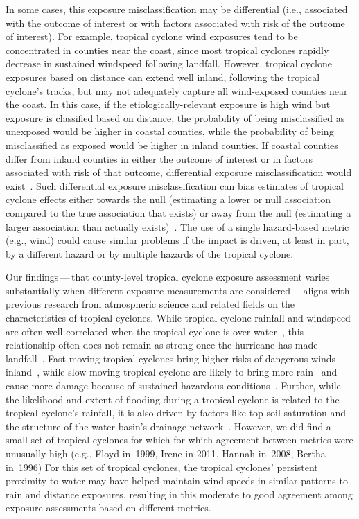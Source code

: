 In some cases, this exposure misclassification may be differential (i.e.,
associated with the outcome of interest or with factors associated with risk of
the outcome of interest). For example, tropical cyclone wind exposures tend to
be concentrated in counties near the coast, since most tropical cyclones
rapidly decrease in sustained windspeed following landfall. However, tropical
cyclone exposures based on distance can extend well inland, following the
tropical cyclone's tracks, but may not adequately capture all wind-exposed
counties near the coast. In this case, if the etiologically-relevant exposure
is high wind but exposure is classified based on distance, the probability of
being misclassified as unexposed would be higher in coastal counties, while the
probability of being misclassified as exposed would be higher in inland
counties. If coastal counties differ from inland counties in either the outcome
of interest or in factors associated with risk of that outcome, differential
exposure misclassification would exist~\parencite{savitz2016interpreting}. Such
differential exposure misclassification can bias estimates of tropical cyclone
effects either towards the null (estimating a lower or null association
compared to the true association that exists) or away from the null (estimating
a larger association than actually exists)~\parencite{savitz2016interpreting,
armstrong1998effect}. The use of a single hazard-based metric (e.g., wind)
could cause similar problems if the impact is driven, at least in part, by a
different hazard or by multiple hazards of the tropical cyclone.

Our findings\,---\,that county-level tropical cyclone exposure assessment varies
substantially when different exposure measurements are considered\,---\,aligns with
previous research from atmospheric science and related fields on the
characteristics of tropical cyclones. While tropical cyclone rainfall and
windspeed are often well-correlated when the tropical cyclone is over
water~\parencite{cerveny2000}, this relationship often does not remain as strong
once the hurricane has made landfall~\parencite{jiang2008}.  Fast-moving tropical
cyclones bring higher risks of dangerous winds inland~\parencite{kruk2010}, while
slow-moving tropical cyclone are likely to bring more
rain~\parencite{rappaport2000} and cause more damage because of sustained hazardous
conditions~\parencite{rezapour2014}. Further, while the likelihood and extent of
flooding during a tropical cyclone is related to the tropical cyclone's
rainfall, it is also driven by factors like top soil saturation and the
structure of the water basin's drainage network~\parencite{chen2015, rees2001}.
However, we did find a small set of tropical cyclones for which for which
agreement between metrics were unusually high (e.g., Floyd in~1999, Irene in
2011, Hannah in~2008, Bertha in~1996) For this set of tropical cyclones, the
tropical cyclones' persistent proximity to water may have helped maintain wind
speeds in similar patterns to rain and distance exposures, resulting in this
moderate to good agreement among exposure assessments based on different
metrics. 

